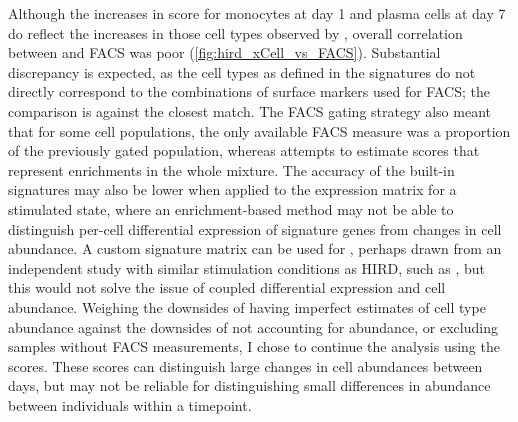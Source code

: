 Although the increases in  score for monocytes at day 1 and plasma cells at day 7 do reflect the increases in those cell types observed by \textcite{sobolev2016AdjuvantedInfluenzaH1N1Vaccination}, overall correlation between  and \gls{FACS} was poor (\cref{fig:hird_xCell_vs_FACS}).
Substantial discrepancy is expected, as the cell types as defined in the  signatures do not directly correspond to the combinations of surface markers used for \gls{FACS}; the comparison is against the closest match.
The \gls{FACS} gating strategy also meant that for some cell populations, the only available \gls{FACS} measure was a proportion of the previously gated population,
whereas  attempts to estimate scores that represent enrichments in the whole mixture.
The accuracy of the built-in signatures may also be lower when applied to the expression matrix for a stimulated state,
where an enrichment-based method may not be able to distinguish per-cell differential expression of signature genes from changes in cell abundance.
A custom signature matrix can be used for , perhaps drawn from an independent study with similar stimulation conditions as \gls{HIRD}, such as \textcite{franco2013IntegrativeGenomicAnalysis}, but this would not solve the issue of coupled differential expression and cell abundance.
Weighing the downsides of having imperfect estimates of cell type abundance against the downsides of not accounting for abundance, or excluding samples without \gls{FACS} measurements, I chose to continue the analysis using the  scores.
These scores can distinguish large changes in cell abundances between days, but may not be reliable for distinguishing small differences in abundance between individuals within a timepoint. 

